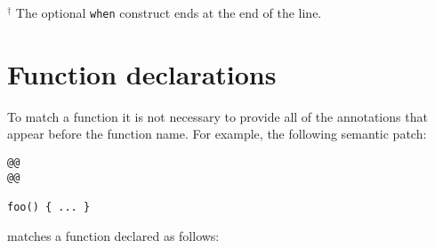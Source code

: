 $^\dag$ The optional \texttt{when} construct ends at the end of the line.

\section{Function declarations}

\begin{grammar}







\end{grammar}

\begin{grammar}
\end{grammar}

To match a function it is not necessary to provide all of the annotations
that appear before the function name.  For example, the following semantic
patch:

\begin{lstlisting}[language=Cocci]
@@
@@

foo() { ... }
\end{lstlisting}

\noindent
matches a function declared as follows:

